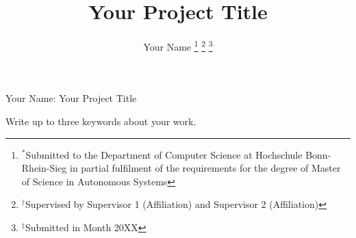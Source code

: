 \documentclass[lettersize,journal]{IEEEtran}
\begin{document}
\title{Your Project Title}

\author{Your Name
\thanks{$^*$Submitted to the Department of Computer Science at Hochschule Bonn-Rhein-Sieg in partial fulfilment of the requirements for the degree of Master of Science in Autonomous Systems}
\thanks{$^{\dagger}$Supervised by Supervisor 1 (Affiliation) and Supervisor 2 (Affiliation)}
\thanks{$^{\ddagger}$Submitted in Month 20XX}} %

%
{Your Name: Your Project Title}

\maketitle



\begin{IEEEkeywords}
Write up to three keywords about your work.
\end{IEEEkeywords}














\end{document}
